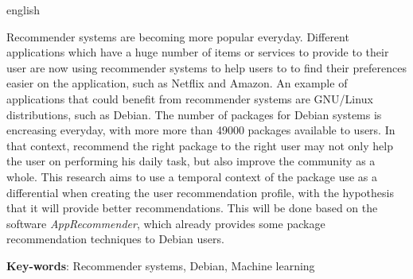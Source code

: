 \begin{resumo}[Abstract]
 \begin{otherlanguage*}{english}

   Recommender systems are becoming more popular everyday. Different
   applications which have a huge number of items or services to provide
   to their user are now using recommender systems to help users to
   to find their preferences easier on the application, such as Netflix and
   Amazon. An example of applications that could benefit from recommender
   systems are GNU/Linux distributions, such as Debian. The number of
   packages for Debian systems is encreasing
   everyday, with more more than 49000 packages
   available to users. In that context, recommend the right package
   to the right user may not only help the user on
   performing his daily task, but also improve the community as a whole.
   This research aims to use a temporal context of the package use as a
   differential when creating the user recommendation profile, with
   the hypothesis that it will provide better recommendations. This
   will be done based on the software \textit{AppRecommender}, which
   already provides some package recommendation techniques to
   Debian users.

   \vspace{\onelineskip}
 
   \noindent 
   \textbf{Key-words}: Recommender systems, Debian, Machine learning
 \end{otherlanguage*}
\end{resumo}
